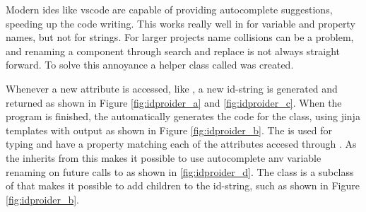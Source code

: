 Modern \glspl{ide} like \gls{vscode} are capable of providing autocomplete suggestions, speeding up the code writing.
This works really well in for variable and property names, but not for strings.
For larger \dash projects name collisions can be a problem, and renaming a component through search and replace is not always straight forward.
To solve this annoyance a helper class called  was created.

Whenever a new attribute is accessed, like , a new id-string is generated and returned as shown in Figure \ref{fig:idproider_a} and \ref{fig:idproider_c}.
When the program is finished, the  automatically generates the code for the  class, using \gls{jinja} templates with output as shown in Figure \ref{fig:idproider_b}.
The  is used for typing and have a property matching each of the attributes accesed through .
As the  inherits from  this makes it possible to use autocomplete anv variable renaming on future calls to  as shown in \ref{fig:idproider_d}.
The  class is a subclass of  that makes it possible to add children to the id-string, such as  shown in Figure \ref{fig:idproider_b}.

